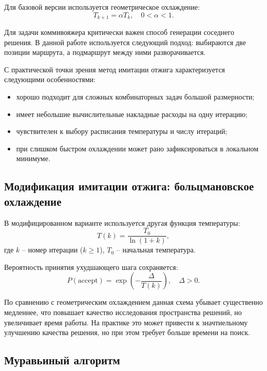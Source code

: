 \documentclass[12pt,a4paper]{article}
\begin{document}
Для базовой версии используется геометрическое охлаждение:
\begin{equation}
T_{k+1} = \alpha T_k, \quad 0<\alpha<1.
\end{equation}

Для задачи коммивояжера критически важен способ генерации соседнего решения.
В данной работе используется следующий подход: выбираются две позиции маршрута, а
подмаршрут между ними разворачивается.

С практической точки зрения метод имитации отжига характеризуется следующими
особенностями:
\begin{itemize}
    \item хорошо подходит для сложных комбинаторных задач большой размерности;
    \item имеет небольшие вычислительные накладные расходы на одну итерацию;
    \item чувствителен к выбору расписания температуры и числу итераций;
    \item при слишком быстром охлаждении может рано зафиксироваться в локальном минимуме.
\end{itemize}

\subsection{Модификация имитации отжига: больцмановское охлаждение}

В модифицированном варианте используется другая функция температуры:
\begin{equation}
T(k) = \frac{T_0}{\ln(1+k)},
\end{equation}
где $k$ -- номер итерации ($k \ge 1$), $T_0$ -- начальная температура.

Вероятность принятия ухудшающего шага сохраняется:
\begin{equation}
P(\text{accept}) = \exp\left(-\frac{\Delta}{T(k)}\right), \quad \Delta>0.
\end{equation}

По сравнению с геометрическим охлаждением данная схема убывает существенно медленнее,
что повышает качество исследования пространства решений, но увеличивает время работы.
На практике это может привести к значтиельному улучшению качества решения, но при
этом требует больше времени на поиск.

\subsection{Муравьиный алгоритм}
\end{document}
